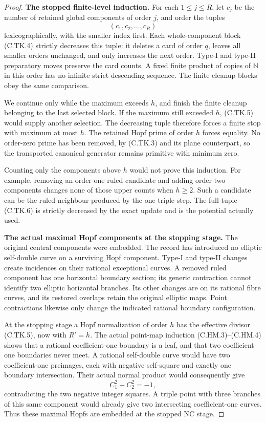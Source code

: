 \begin{proof}
\par\medskip\noindent\textbf{The stopped finite-level induction.}
For each \(1\le j\le R\), let \(c_j\) be the
number of retained global components of order
\(j\), and order the tuples
\[
                     (c_1,c_2,\ldots,c_R)
 \tag{C.TK.6}
\]
lexicographically, with the smaller index first.
Each whole-component block (C.TK.4) strictly
decreases this tuple: it deletes a card of
order \(q\), leaves all smaller orders unchanged,
and only increases the next order. Type-I and
type-II preparatory moves preserve the card
counts. A fixed finite product of copies of
\(\mathbb N\) in this order has no infinite
strict descending sequence. The finite cleanup
blocks obey the same comparison.

We continue only while the maximum exceeds
\(h\), and finish the finite cleanup belonging
to the last selected block. If the maximum
still exceeded \(h\), (C.TK.5) would supply
another selection. The decreasing tuple
therefore forces a finite stop with maximum
at most \(h\). The retained Hopf prime of
order \(h\) forces equality. No order-zero
prime has been removed, by (C.TK.3) and its
plane counterpart, so the transported canonical
generator remains primitive with minimum zero.

Counting only the components above \(h\)
would not prove this induction. For example,
removing an order-one ruled candidate and
adding order-two components changes none of
those upper counts when \(h\ge2\). Such a
candidate can be the ruled neighbour produced
by the one-triple step. The full tuple
(C.TK.6) is strictly decreased by the exact
update and is the potential actually used.

\par\medskip\noindent\textbf{The actual maximal Hopf components at the stopping stage.}
The original central components were embedded.
The record has introduced no elliptic self-double
curve on a surviving Hopf component. Type-I and
type-II changes create incidences on their
rational exceptional curves. A removed ruled
component has one horizontal boundary section;
its generic contraction cannot identify two
elliptic horizontal branches. Its other changes
are on its rational fibre curves, and its
restored overlaps retain the original elliptic
maps. Point contractions likewise only change
the indicated rational boundary configuration.

At the stopping stage a Hopf normalization
of order \(h\) has the effective divisor
(C.TK.5), now with \(R'=h\). The actual
point-map induction (C.HM.3)--(C.HM.4)
shows that a rational coefficient-one boundary
is a leaf, and that two coefficient-one
boundaries never meet. A rational self-double
curve would have two coefficient-one preimages,
each with negative self-square and exactly
one boundary intersection. Their actual normal
product would consequently give
\[
                        C_1^2+C_2^2=-1,
 \tag{C.TK.7}
\]
contradicting the two negative integer squares.
A triple point with three branches of this same
component would already give two intersecting
coefficient-one curves. Thus these maximal
Hopfs are embedded at the stopped NC stage.


\end{proof}
